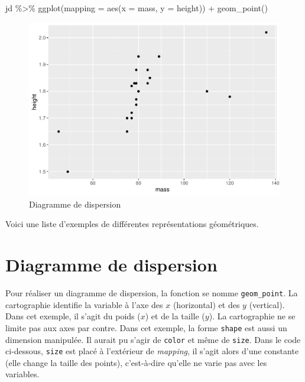 \documentclass[
]{book}
\newenvironment{Shaded}{}{}
\newcommand{\AttributeTok}[1]{#1}
\newcommand{\FunctionTok}[1]{#1}
\newcommand{\NormalTok}[1]{#1}
\newcommand{\SpecialCharTok}[1]{#1}
\begin{document}
\begin{Shaded}
\begin{Highlighting}[]
\NormalTok{jd }\SpecialCharTok{\%\textgreater{}\%} 
  \FunctionTok{ggplot}\NormalTok{(}\AttributeTok{mapping =} \FunctionTok{aes}\NormalTok{(}\AttributeTok{x =}\NormalTok{ mass, }\AttributeTok{y =}\NormalTok{ height)) }\SpecialCharTok{+} 
  \FunctionTok{geom\_point}\NormalTok{()}
\end{Highlighting}
\end{Shaded}

\begin{figure}

{\centering \includegraphics[width=0.75\linewidth,height=0.75\textheight]{07-Visualiser_files/figure-latex/ggplotpoint-1} 

}

\caption{Diagramme de dispersion}\label{fig:ggplotpoint}
\end{figure}

Voici une liste d'exemples de différentes représentations géométriques.

\hypertarget{diagramme-de-dispersion}{%
\section{Diagramme de dispersion}\label{diagramme-de-dispersion}}

Pour réaliser un diagramme de dispersion, la fonction se nomme \texttt{geom\_point}. La cartographie identifie la variable à l'axe des \(x\) (horizontal) et des \(y\) (vertical). Dans cet exemple, il s'agit du poids (\(x\)) et de la taille (\(y\)). La cartographie ne se limite pas aux axes par contre. Dans cet exemple, la forme \texttt{shape} est aussi un dimension manipulée. Il aurait pu s'agir de \texttt{color} et même de \texttt{size}. Dans le code ci-dessous, \texttt{size} est placé à l'extérieur de \emph{mapping}, il s'agit alors d'une constante (elle change la taille des points), c'est-à-dire qu'elle ne varie pas avec les variables.
\end{document}
